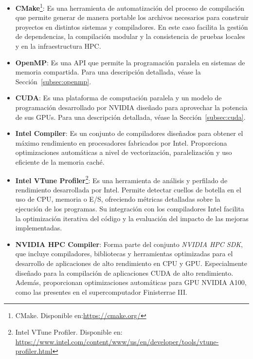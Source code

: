 \begin{itemize}
    \item \textbf{CMake}\footnote{CMake. Disponible en:\url{https://cmake.org/}}:
    Es una herramienta de automatización del proceso de compilación que permite generar de manera portable los archivos necesarios para construir proyectos en distintos sistemas y compiladores.
    En este caso facilita la gestión de dependencias, la compilación modular y la consistencia de pruebas locales y en la infraestructura HPC\@.

    \item \textbf{OpenMP}:
    Es una API que permite la programación paralela en sistemas de memoria compartida.
    Para una descripción detallada, véase la Sección~\ref{subsec:openmp}.
    \item \textbf{CUDA}:
    Es una plataforma de computación paralela y un modelo de programación desarrollado por NVIDIA diseñado para aprovechar la potencia de sus GPUs.
    Para una descripción detallada, véase la Sección~\ref{subsec:cuda}.

    \item \textbf{Intel Compiler}:
    Es un conjunto de compiladores diseñados para obtener el máximo rendimiento en procesadores fabricados por Intel.
    Proporciona optimizaciones automáticas a nivel de vectorización, paralelización y uso eficiente de la memoria caché.

    \item \textbf{Intel VTune Profiler}\footnote{Intel VTune Profiler. Disponible en: \url{https://www.intel.com/content/www/us/en/developer/tools/vtune-profiler.html}}:
    Es una herramienta de análisis y perfilado de rendimiento desarrollada por Intel.
    Permite detectar cuellos de botella en el uso de CPU, memoria o E/S, ofreciendo métricas detalladas sobre la ejecución de los programas.
    Su integración con los compiladores Intel facilita la optimización iterativa del código y la evaluación del impacto de las mejoras implementadas.

    \item \textbf{NVIDIA HPC Compiler}:
    Forma parte del conjunto \textit{NVIDIA HPC SDK}, que incluye compiladores, bibliotecas y herramientas optimizadas para el desarrollo de aplicaciones de alto rendimiento en CPU y GPU.
    Especialmente diseñado para la compilación de aplicaciones CUDA de alto rendimiento.
    Además, proporcionan optimizaciones automáticas para GPU NVIDIA A100, como las presentes en el supercomputador Finisterrae III.


\end{itemize}
